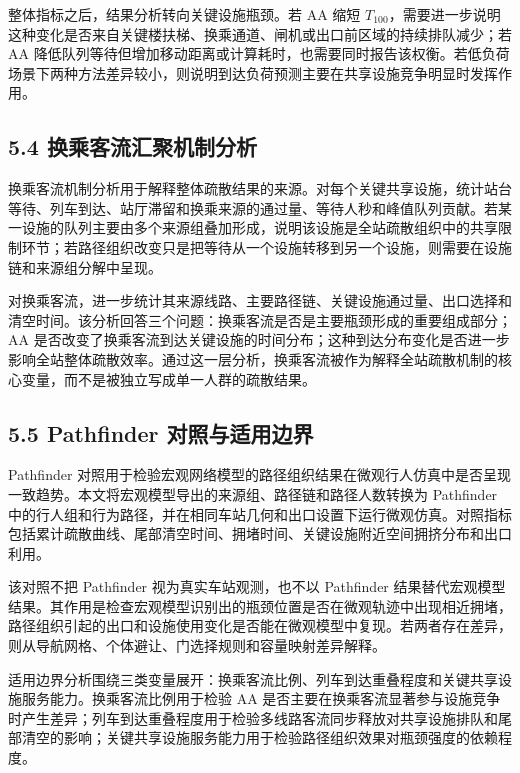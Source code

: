 \documentclass[UTF8,a4paper,12pt]{ctexart}
\begin{document}
整体指标之后，结果分析转向关键设施瓶颈。若 AA 缩短 \(T_{100}\)，需要进一步说明这种变化是否来自关键楼扶梯、换乘通道、闸机或出口前区域的持续排队减少；若 AA 降低队列等待但增加移动距离或计算耗时，也需要同时报告该权衡。若低负荷场景下两种方法差异较小，则说明到达负荷预测主要在共享设施竞争明显时发挥作用。

\subsection{5.4 换乘客流汇聚机制分析}

换乘客流机制分析用于解释整体疏散结果的来源。对每个关键共享设施，统计站台等待、列车到达、站厅滞留和换乘来源的通过量、等待人秒和峰值队列贡献。若某一设施的队列主要由多个来源组叠加形成，说明该设施是全站疏散组织中的共享限制环节；若路径组织改变只是把等待从一个设施转移到另一个设施，则需要在设施链和来源组分解中呈现。

对换乘客流，进一步统计其来源线路、主要路径链、关键设施通过量、出口选择和清空时间。该分析回答三个问题：换乘客流是否是主要瓶颈形成的重要组成部分；AA 是否改变了换乘客流到达关键设施的时间分布；这种到达分布变化是否进一步影响全站整体疏散效率。通过这一层分析，换乘客流被作为解释全站疏散机制的核心变量，而不是被独立写成单一人群的疏散结果。

\subsection{5.5 Pathfinder 对照与适用边界}

Pathfinder 对照用于检验宏观网络模型的路径组织结果在微观行人仿真中是否呈现一致趋势。本文将宏观模型导出的来源组、路径链和路径人数转换为 Pathfinder 中的行人组和行为路径，并在相同车站几何和出口设置下运行微观仿真。对照指标包括累计疏散曲线、尾部清空时间、拥堵时间、关键设施附近空间拥挤分布和出口利用。

该对照不把 Pathfinder 视为真实车站观测，也不以 Pathfinder 结果替代宏观模型结果。其作用是检查宏观模型识别出的瓶颈位置是否在微观轨迹中出现相近拥堵，路径组织引起的出口和设施使用变化是否能在微观模型中复现。若两者存在差异，则从导航网格、个体避让、门选择规则和容量映射差异解释。

适用边界分析围绕三类变量展开：换乘客流比例、列车到达重叠程度和关键共享设施服务能力。换乘客流比例用于检验 AA 是否主要在换乘客流显著参与设施竞争时产生差异；列车到达重叠程度用于检验多线路客流同步释放对共享设施排队和尾部清空的影响；关键共享设施服务能力用于检验路径组织效果对瓶颈强度的依赖程度。
\end{document}
